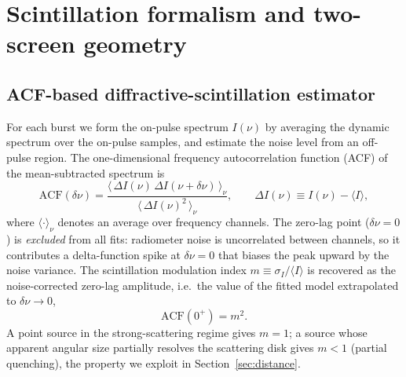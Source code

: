%

\section{Scintillation formalism and two-screen geometry}
\label{sec:twoscreen}

\subsection{ACF-based diffractive-scintillation estimator}
\label{sec:acf}

For each burst we form the on-pulse spectrum $I(\nu)$ by averaging the
dynamic spectrum over the on-pulse samples, and estimate the noise level
from an off-pulse region. The one-dimensional frequency autocorrelation
function (ACF) of the mean-subtracted spectrum is
%
\begin{equation}
\mathrm{ACF}(\delta\nu)
  = \frac{\big\langle\, \Delta I(\nu)\,\Delta I(\nu+\delta\nu)\,\big\rangle_\nu}
         {\big\langle\, \Delta I(\nu)^2\,\big\rangle_\nu},
\qquad
\Delta I(\nu) \equiv I(\nu) - \langle I\rangle,
\label{eq:acf}
\end{equation}
%
where $\langle\cdot\rangle_\nu$ denotes an average over frequency channels.
The zero-lag point ($\delta\nu=0$) is \emph{excluded} from all fits: radiometer
noise is uncorrelated between channels, so it contributes a delta-function
spike at $\delta\nu=0$ that biases the peak upward by the noise variance.
The scintillation modulation index $m\equiv\sigma_I/\langle I\rangle$ is
recovered as the noise-corrected zero-lag amplitude, i.e.\ the value of
the fitted model extrapolated to $\delta\nu\to0$,
%
\begin{equation}
\mathrm{ACF}(0^{+}) = m^{2}.
\label{eq:m2}
\end{equation}
%
A point source in the strong-scattering regime gives $m=1$; a source whose
apparent angular size partially resolves the scattering disk gives $m<1$
(partial quenching), the property we exploit in
Section~\ref{sec:distance}.

